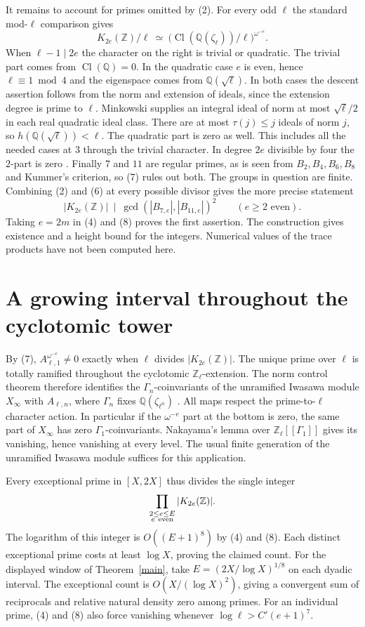 \documentclass[11pt]{article}
\newcommand{\Z}{\mathbb Z}
\newcommand{\Q}{\mathbb Q}
\newcommand{\Cl}{\operatorname{Cl}}
\begin{document}
It remains to account for primes omitted by (2). For every odd $\ell$ the
standard mod-$\ell$ comparison \cite[Thm.~5.1]{jkpsz} gives
\[
 K_{2e}(\Z)/\ell \ \simeq\
 \bigl(\Cl(\Q(\zeta_\ell))/\ell\bigr)^{\omega^{-e}}. \tag{7}
\]
When $\ell-1\mid2e$ the character on the right is trivial or quadratic.
The trivial part comes from $\Cl(\Q)=0$. In the quadratic case
$e$ is even, hence $\ell\equiv1\bmod4$ and the eigenspace comes from
$\Q(\sqrt{\ell})$. In both cases the descent assertion follows from the
norm and extension of ideals, since the extension degree is prime to $\ell$.
Minkowski supplies an integral ideal of norm at most $\sqrt{\ell}/2$ in
each real quadratic ideal class. There are at most $\tau(j)\le j$ ideals
of norm $j$, so $h(\Q(\sqrt\ell))<\ell$. The quadratic part is zero as
well. This includes all the needed cases at $3$ through the trivial
character. In degree $2e$ divisible by four the $2$-part is zero
\cite{rognes}. Finally $7$ and $11$ are regular primes, as is seen from
$B_2,B_4,B_6,B_8$ and Kummer's criterion, so (7) rules out both.
The groups in question are finite. Combining (2) and (6) at every
possible divisor gives the more precise statement
\[
        |K_{2e}(\Z)|\ \mid\ \gcd(|B_{7,e}|,|B_{11,e}|)^2
        \qquad (e\ge2\text{ even}). \tag{8}
\]
Taking $e=2m$ in (4) and (8) proves the first assertion. The construction
gives existence and a height bound for the integers. Numerical values of
the trace products have not been computed here.

\newpage
\section{A growing interval throughout the cyclotomic tower}
By (7), $A_{\ell,1}^{\omega^{-e}}\ne0$ exactly when $\ell$ divides
$|K_{2e}(\Z)|$. The unique prime over $\ell$ is totally ramified throughout
the cyclotomic $\Z_\ell$-extension. The norm control theorem therefore
identifies the $\Gamma_n$-coinvariants of the unramified Iwasawa module
$X_\infty$ with $A_{\ell,n}$, where $\Gamma_n$ fixes $\Q(\zeta_{\ell^n})$
\cite[chapter~3]{sharifi}. All maps respect the prime-to-$\ell$ character
action. In particular if the $\omega^{-e}$ part at the bottom is zero,
the same part of $X_\infty$ has zero $\Gamma_1$-coinvariants.
Nakayama's lemma over $\Z_\ell[[\Gamma_1]]$ gives its vanishing, hence
vanishing at every level. The usual finite generation of the unramified
Iwasawa module suffices for this application.

Every exceptional prime in $[X,2X]$ thus divides the single integer
\[
                    \prod_{\substack{2\le e\le E\\ e\ {\rm even}}}
                           |K_{2e}(\Z)|.
\]
The logarithm of this integer is $O((E+1)^8)$ by (4) and (8). Each
distinct exceptional prime costs at least $\log X$, proving the claimed
count. For the displayed window of Theorem~\ref{main}, take
$E=(2X/\log X)^{1/8}$ on each dyadic interval. The exceptional count is
$O(X/(\log X)^2)$, giving a convergent sum of reciprocals and relative
natural density zero among primes. For an individual prime, (4) and (8)
also force vanishing whenever $\log\ell>C'(e+1)^7$.
\end{document}
